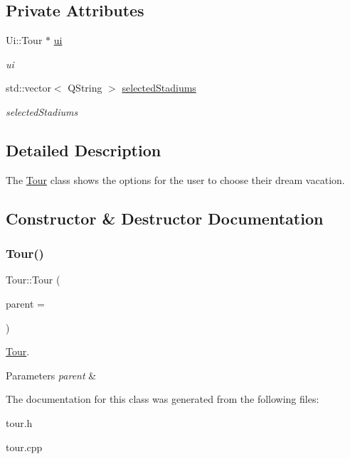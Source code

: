 \subsection*{Private Attributes}
\begin{DoxyCompactItemize}
\item 
\mbox{\label{class_tour_a986e5bfda5699d9a6fe32ef756fec75c}} 
Ui\+::\+Tour $\ast$ \hyperlink{class_tour_a986e5bfda5699d9a6fe32ef756fec75c}{ui}
\begin{DoxyCompactList}\small\item\em ui \end{DoxyCompactList}\item 
\mbox{\label{class_tour_a964f0e2d61252c76fa8c9f916346f8c3}} 
std\+::vector$<$ Q\+String $>$ \hyperlink{class_tour_a964f0e2d61252c76fa8c9f916346f8c3}{selected\+Stadiums}
\begin{DoxyCompactList}\small\item\em selected\+Stadiums \end{DoxyCompactList}\end{DoxyCompactItemize}


\subsection{Detailed Description}
The \hyperlink{class_tour}{Tour} class shows the options for the user to choose their dream vacation. 

\subsection{Constructor \& Destructor Documentation}
\mbox{\label{class_tour_af2f0737a5f0fac6b6bd564a999525ee1}} 
\subsubsection{\texorpdfstring{Tour()}{Tour()}}
{\footnotesize\ttfamily Tour\+::\+Tour (\begin{DoxyParamCaption}\item[{Q\+Widget $\ast$}]{parent = {} }\end{DoxyParamCaption})\hspace{0.3cm}{\ttfamily [explicit]}}



\hyperlink{class_tour}{Tour}. 


\begin{DoxyParams}{Parameters}
{\em parent} & \\
\hline
\end{DoxyParams}


The documentation for this class was generated from the following files\+:\begin{DoxyCompactItemize}
\item 
tour.\+h\item 
tour.\+cpp\end{DoxyCompactItemize}
